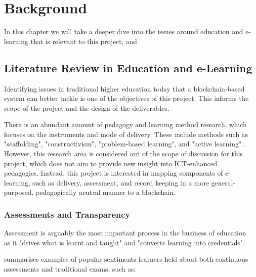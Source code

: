 
\chapter{Background}
    \graphicspath{{Chapter2/Figs/Raster/}{Chapter2/Figs/PDF/}{Chapter2/Figs/}}
In this chapter we will take a deeper dive into the issues around education and e-learning that 
is relevant to this project, and 

\section{Literature Review in Education and e-Learning}

Identifying issues in traditional higher education today that a blockchain-based system can better 
tackle is one of the objectives of this project. This informs the scope of the 
project and the design of the deliverables.

There is an abundant amount of pedagogy and learning method research, which focuses on the 
instruments and mode of delivery. These include methods such as "scaffolding", "constructivism", 
"problem-based learning", and "active learning" \citep{ali2005effective}. However, this 
research area is considered out of the scope of discussion for this project, which does not 
aim to provide new insight into ICT-enhanced pedagogies. Instead, this project is interested in 
mapping components of e-learning, such as delivery, assessment, and record keeping 
in a more general-purposed, pedagogically neutral manner to a blockchain.

\subsection{Assessments and Transparency}

Assessment is arguably the most important process in the business of education as it "drives what 
is learnt and taught" and "converts learning into credentials". \citep[p.160]{campbell2010digital}

\citet{brown1999assessment} summarises examples of popular sentiments learners held about both 
continuous assessments and traditional exams, such as:

